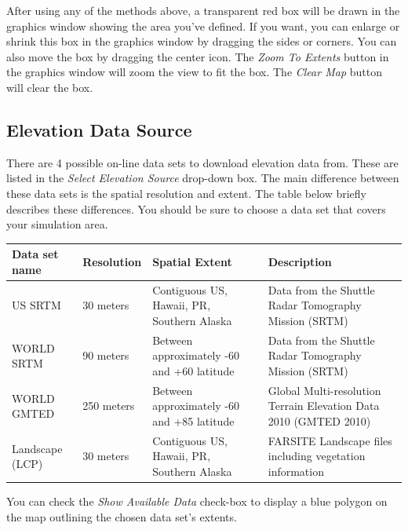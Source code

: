 \documentclass[12pt]{article}
\begin{document}
After using any of the methods above, a transparent red box will be drawn in the graphics window showing the area you've defined.  If you want, you can enlarge or shrink this box in the graphics window by dragging the sides or corners.  You can also move the box by dragging the center icon.  The \textit{Zoom To Extents} button in the graphics window will zoom the view to fit the box. The \textit{Clear Map} button will clear the box.

\subsection*{Elevation Data Source}

There are 4 possible on-line data sets to download elevation data from.  These are listed in the \textit{Select Elevation Source} drop-down box.  The main difference between these data sets is the spatial resolution and extent.  The table below briefly describes these differences.  You should be sure to choose a data set that covers your simulation area.

\begin{center}
    \begin{tabular}{| l | l | p{1.75in} | p{1.8in} |}
    \hline
    Data set name & Resolution & Spatial Extent & Description \\ \hline

    US SRTM & 30 meters  & Contiguous US, Hawaii, PR, Southern Alaska &
    Data from the Shuttle Radar Tomography Mission (SRTM) \\ \hline

    WORLD SRTM & 90 meters & Between approximately -60 and +60 latitude &
    Data from the Shuttle Radar Tomography Mission (SRTM) \\ \hline

    WORLD GMTED & 250 meters & Between approximately -60 and +85 latitude &
    Global Multi-resolution Terrain Elevation Data 2010 (GMTED 2010) \\ \hline

    Landscape (LCP) & 30 meters & Contiguous US, Hawaii, PR, Southern Alaska &
    FARSITE Landscape files including vegetation information \\ \hline
\end{tabular}
\end{center}
You can check the \textit{Show Available Data} check-box to display a blue polygon on the map outlining the chosen data set's extents.
\end{document}
